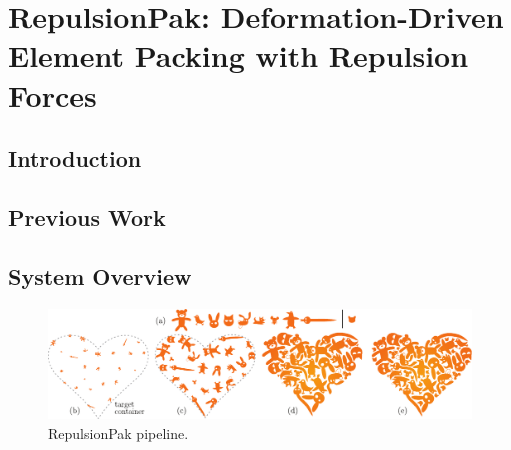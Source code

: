\chapter[RepulsionPak: Deformation-Driven Element Packing \newline with Repulsion Forces]
{RepulsionPak: Deformation-Driven Element Packing with Repulsion Forces}



\section{Introduction}



\section{Previous Work}


\section{System Overview}




\begin{figure}[h]
\centering
\includegraphics[width=1.0\textwidth]{figures/repulsionpak/pipeline.pdf} 
\caption[RepulsionPak pipeline]
{\label{fig_repulsionpak_pipeline} 
RepulsionPak pipeline. }
\end{figure}

